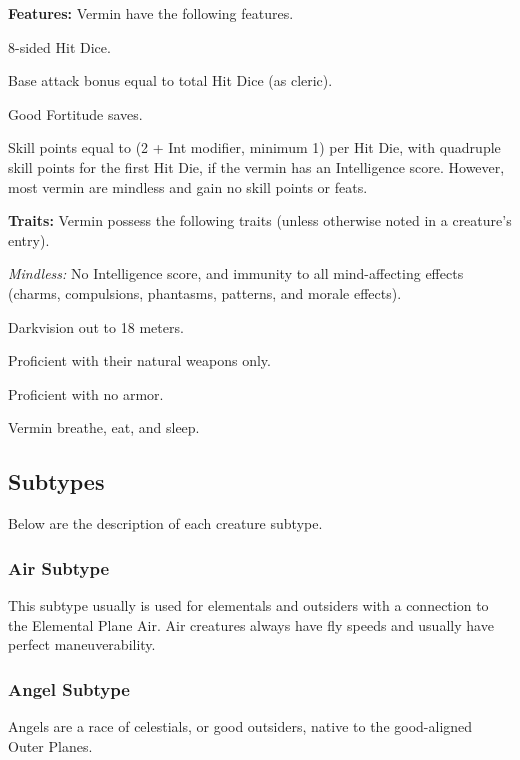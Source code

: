 \textbf{Features:} Vermin have the following features.
\begin{itemize*}
\item 8-sided Hit Dice.
\item Base attack bonus equal to \threequarters total Hit Dice (as cleric).
\item Good Fortitude saves.
\item Skill points equal to (2 + Int modifier, minimum 1) per Hit Die, with quadruple skill points for the first Hit Die, if the vermin has an Intelligence score. However, most vermin are mindless and gain no skill points or feats.
\end{itemize*}

\textbf{Traits:} Vermin possess the following traits (unless otherwise noted in a creature's entry).

\begin{itemize*}
\item \textit{Mindless:} No Intelligence score, and immunity to all mind-affecting effects (charms, compulsions, phantasms, patterns, and morale effects).
\item Darkvision out to 18 meters.
\item Proficient with their natural weapons only.
\item Proficient with no armor.
\item Vermin breathe, eat, and sleep.
\end{itemize*}

\subsection{Subtypes}
Below are the description of each creature subtype.

\subsubsection{Air Subtype}
This subtype usually is used for elementals and outsiders with a connection to the Elemental Plane Air. Air creatures always have fly speeds and usually have perfect maneuverability.

\subsubsection{Angel Subtype}
Angels are a race of celestials, or good outsiders, native to the good-aligned Outer Planes.

